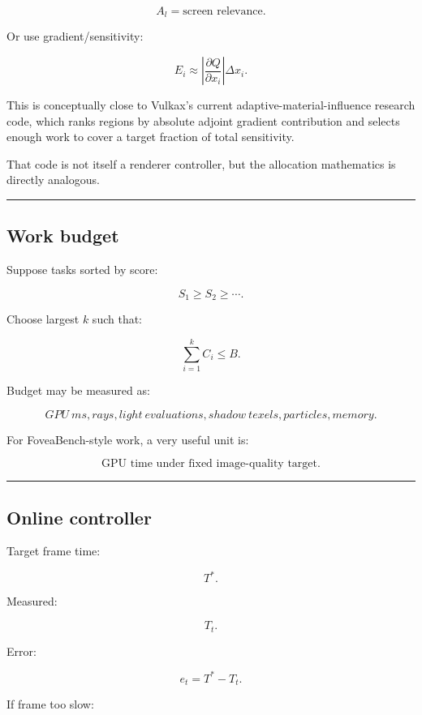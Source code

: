 \[
A_l=\text{screen relevance}.
\]

Or use gradient/sensitivity:

\[
E_i
\approx
\left|
\frac{\partial Q}{\partial x_i}
\right|
\Delta x_i.
\]

This is conceptually close to Vulkax's current adaptive-material-influence research code, which ranks regions by absolute adjoint gradient contribution and selects enough work to cover a target fraction of total sensitivity.

That code is not itself a renderer controller, but the allocation mathematics is directly analogous.

\begin{center}\rule{0.5\linewidth}{0.5pt}\end{center}

\subsection{Work budget}\label{04-visual-computing-ii-ch040-work-budget}

Suppose tasks sorted by score:

\[
S_1\ge S_2\ge\cdots.
\]

Choose largest \(k\) such that:

\[
\boxed{
\sum_{i=1}^{k}C_i
\le B.
}
\]

Budget may be measured as:

\[
GPU\ ms,
rays,
light\ evaluations,
shadow\ texels,
particles,
memory.
\]

For FoveaBench-style work, a very useful unit is:

\[
\boxed{
\text{GPU time under fixed image-quality target}.
}
\]

\begin{center}\rule{0.5\linewidth}{0.5pt}\end{center}

\subsection{Online controller}\label{04-visual-computing-ii-ch040-online-controller}

Target frame time:

\[
T^*.
\]

Measured:

\[
T_t.
\]

Error:

\[
e_t=
T^*-T_t.
\]

If frame too slow:


